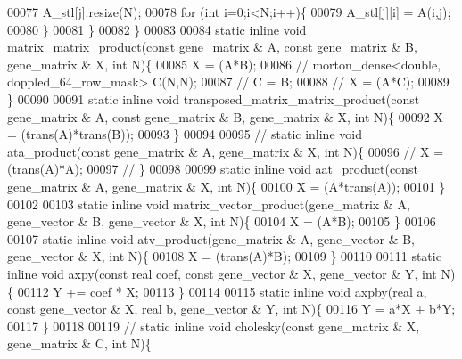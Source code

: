 \begin{DoxyCode}
00077       A\_stl[j].resize(N);
00078       \textcolor{keywordflow}{for} (\textcolor{keywordtype}{int} i=0;i<N;i++)\{
00079         A\_stl[j][i] = A(i,j);
00080       \}
00081     \}
00082   \}
00083 
00084   \textcolor{keyword}{static} \textcolor{keyword}{inline} \textcolor{keywordtype}{void} matrix\_matrix\_product(\textcolor{keyword}{const} gene\_matrix & A, \textcolor{keyword}{const} gene\_matrix & B, gene\_matrix & X, \textcolor{keywordtype}{
      int} N)\{
00085     X = (A*B);
00086 \textcolor{comment}{//     morton\_dense<double, doppled\_64\_row\_mask> C(N,N);}
00087 \textcolor{comment}{//     C = B;}
00088 \textcolor{comment}{//     X = (A*C);}
00089   \}
00090 
00091   \textcolor{keyword}{static} \textcolor{keyword}{inline} \textcolor{keywordtype}{void} transposed\_matrix\_matrix\_product(\textcolor{keyword}{const} gene\_matrix & A, \textcolor{keyword}{const} gene\_matrix & B, 
      gene\_matrix & X, \textcolor{keywordtype}{int} N)\{
00092     X = (trans(A)*trans(B));
00093   \}
00094 
00095 \textcolor{comment}{//   static inline void ata\_product(const gene\_matrix & A, gene\_matrix & X, int N)\{}
00096 \textcolor{comment}{//     X = (trans(A)*A);}
00097 \textcolor{comment}{//   \}}
00098 
00099   \textcolor{keyword}{static} \textcolor{keyword}{inline} \textcolor{keywordtype}{void} aat\_product(\textcolor{keyword}{const} gene\_matrix & A, gene\_matrix & X, \textcolor{keywordtype}{int} N)\{
00100     X = (A*trans(A));
00101   \}
00102 
00103   \textcolor{keyword}{static} \textcolor{keyword}{inline} \textcolor{keywordtype}{void} matrix\_vector\_product(gene\_matrix & A, gene\_vector & B, gene\_vector & X, \textcolor{keywordtype}{int} N)\{
00104     X = (A*B);
00105   \}
00106 
00107   \textcolor{keyword}{static} \textcolor{keyword}{inline} \textcolor{keywordtype}{void} atv\_product(gene\_matrix & A, gene\_vector & B, gene\_vector & X, \textcolor{keywordtype}{int} N)\{
00108     X = (trans(A)*B);
00109   \}
00110 
00111   \textcolor{keyword}{static} \textcolor{keyword}{inline} \textcolor{keywordtype}{void} axpy(\textcolor{keyword}{const} real coef, \textcolor{keyword}{const} gene\_vector & X, gene\_vector & Y, \textcolor{keywordtype}{int} N)\{
00112     Y += coef * X;
00113   \}
00114 
00115   \textcolor{keyword}{static} \textcolor{keyword}{inline} \textcolor{keywordtype}{void} axpby(real a, \textcolor{keyword}{const} gene\_vector & X, real b, gene\_vector & Y, \textcolor{keywordtype}{int} N)\{
00116     Y = a*X + b*Y;
00117   \}
00118 
00119 \textcolor{comment}{//   static inline void cholesky(const gene\_matrix & X, gene\_matrix & C, int N)\{}

\end{DoxyCode}
